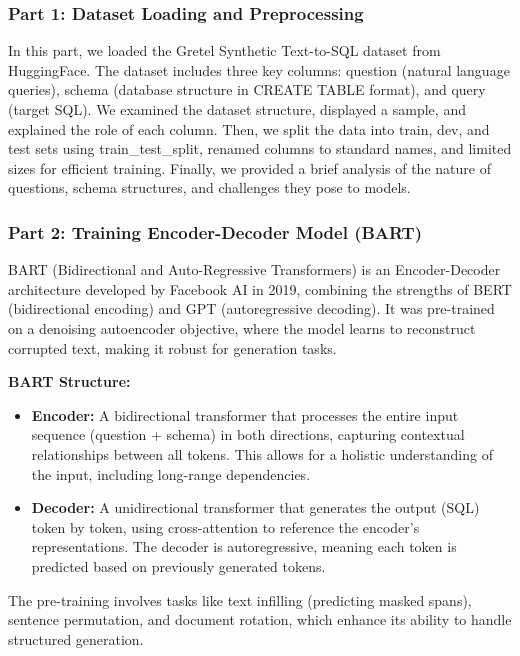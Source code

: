 \subsubsection{Part 1: Dataset Loading and Preprocessing}
In this part, we loaded the Gretel Synthetic Text-to-SQL dataset from HuggingFace. The dataset includes three key columns: question (natural language queries), schema (database structure in CREATE TABLE format), and query (target SQL). We examined the dataset structure, displayed a sample, and explained the role of each column. Then, we split the data into train, dev, and test sets using train\_test\_split, renamed columns to standard names, and limited sizes for efficient training. Finally, we provided a brief analysis of the nature of questions, schema structures, and challenges they pose to models.

\subsubsection{Part 2: Training Encoder-Decoder Model (BART)}
BART (Bidirectional and Auto-Regressive Transformers) is an Encoder-Decoder architecture developed by Facebook AI in 2019, combining the strengths of BERT (bidirectional encoding) and GPT (autoregressive decoding). It was pre-trained on a denoising autoencoder objective, where the model learns to reconstruct corrupted text, making it robust for generation tasks.

\textbf{BART Structure:}
\begin{itemize}
    \item \textbf{Encoder:} A bidirectional transformer that processes the entire input sequence (question + schema) in both directions, capturing contextual relationships between all tokens. This allows for a holistic understanding of the input, including long-range dependencies.
    \item \textbf{Decoder:} A unidirectional transformer that generates the output (SQL) token by token, using cross-attention to reference the encoder's representations. The decoder is autoregressive, meaning each token is predicted based on previously generated tokens.
\end{itemize}

The pre-training involves tasks like text infilling (predicting masked spans), sentence permutation, and document rotation, which enhance its ability to handle structured generation.

